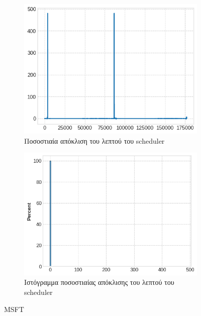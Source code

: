\documentclass[12pt, a4paper]{article}
\begin{document}
\begin{figure}[h!]
\begin{subfigure}[b]{0.45\textwidth}
\centering
\includegraphics[width=\textwidth]{delay_candlestick_line_msft.png}
\caption{Ποσοστιαία απόκλιση του λεπτού του scheduler}
\label{fig:sub3}
\end{subfigure}
\hfill
\begin{subfigure}[b]{0.45\textwidth}
\centering
\includegraphics[width=\textwidth]{delay_candlestick_hist_msft.png}
\caption{Ιστόγραμμα ποσοστιαίας απόκλισης του λεπτού του scheduler}
\end{subfigure}
\caption{MSFT}
\end{figure}
\end{document}
